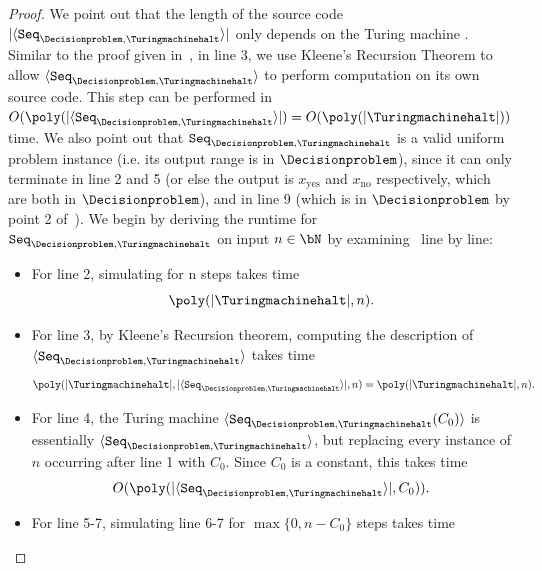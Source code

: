 \begin{proof}
	 We point out that the length of the source code $|\langle \UniformseqREproof \rangle|$ only depends on the Turing machine \Turingmachinehalt. Similar to the proof given in~, in line 3, we use Kleene's Recursion Theorem to allow $\langle \UniformseqREproof \rangle$ to perform computation on its own source code. This step can be performed in $O(\poly(|\langle \UniformseqREproof \rangle|) = O(\poly(|\text{\Turingmachinehalt}|))$ time. We also point out that $\UniformseqREproof$ is a valid uniform problem instance (i.e. its output range is in $\Decisionproblem$), since it can only terminate in line 2 and 5 (or else the output is $x_{\text{yes}}$ and $x_{\text{no}}$ respectively, which are both in $\Decisionproblem$), and in line 9 (which is in $\Decisionproblem$ by point 2 of~). We begin by deriving the runtime for $\UniformseqREproof$ on input $n \in \bN$ by examining~ line by line:
	\begin{itemize}
		\item For line 2, simulating \Turingmachinehalt for n steps takes time 
		\begin{equation*}
			\poly(|\text{\Turingmachinehalt}|, n).
		\end{equation*}
		\item For line 3, by Kleene's Recursion theorem, computing the description of $\langle \UniformseqREproof \rangle$ takes time
		\begin{equation*}
			\poly(|\text{\Turingmachinehalt}|, |\langle \UniformseqREproof \rangle|, n) = \poly(|\text{\Turingmachinehalt}|, n).
		\end{equation*} 
		\item For line 4, the Turing machine $\langle \texttt{Seq}_{\Decisionproblem,\text{\Turingmachinehalt}}(C_0) \rangle$ is essentially $\langle \texttt{Seq}_{\Decisionproblem,\text{\Turingmachinehalt}} \rangle$, but replacing every instance of $n$ occurring after line 1 with $C_0$. Since $C_0$ is a constant, this takes time 
		\begin{equation*}
			O(\poly(|\langle \UniformseqREproof \rangle|, C_0)).
		\end{equation*}
		\item For line 5-7, simulating line 6-7 for $\max\{0, n - C_0\}$ steps takes time 

\end{itemize}
\end{proof}
